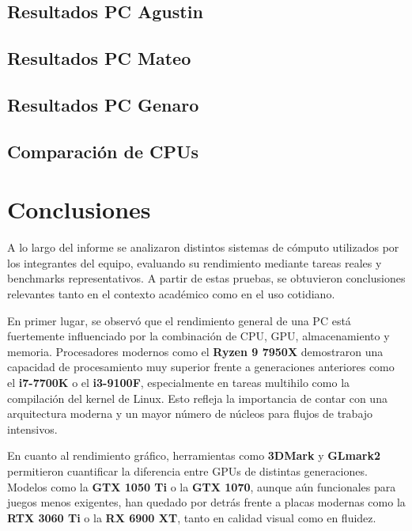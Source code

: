 \documentclass[a4paper,12pt]{article}
\begin{document}
\subsection{Resultados PC Agustin}


\newpage

\subsection{Resultados PC Mateo}


\newpage

\subsection{Resultados PC Genaro}


\newpage

\subsection{Comparación de CPUs}


\newpage

\section{Conclusiones}

A lo largo del informe se analizaron distintos sistemas de cómputo utilizados por los integrantes del equipo, evaluando su rendimiento mediante tareas reales y benchmarks representativos. A partir de estas pruebas, se obtuvieron conclusiones relevantes tanto en el contexto académico como en el uso cotidiano.

En primer lugar, se observó que el rendimiento general de una PC está fuertemente influenciado por la combinación de CPU, GPU, almacenamiento y memoria. Procesadores modernos como el \textbf{Ryzen 9 7950X} demostraron una capacidad de procesamiento muy superior frente a generaciones anteriores como el \textbf{i7-7700K} o el \textbf{i3-9100F}, especialmente en tareas multihilo como la compilación del kernel de Linux. Esto refleja la importancia de contar con una arquitectura moderna y un mayor número de núcleos para flujos de trabajo intensivos.

En cuanto al rendimiento gráfico, herramientas como \textbf{3DMark} y \textbf{GLmark2} permitieron cuantificar la diferencia entre GPUs de distintas generaciones. Modelos como la \textbf{GTX 1050 Ti} o la \textbf{GTX 1070}, aunque aún funcionales para juegos menos exigentes, han quedado por detrás frente a placas modernas como la \textbf{RTX 3060 Ti} o la \textbf{RX 6900 XT}, tanto en calidad visual como en fluidez.
\end{document}
